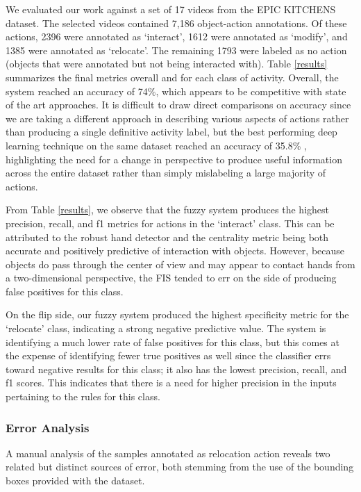 \documentclass[12pt]{report}
\begin{document}
We evaluated our work against a set of 17 videos from the EPIC KITCHENS dataset. The selected videos contained 7,186 object-action annotations. Of these actions, 2396 were annotated as `interact', 1612 were annotated as `modify', and 1385 were annotated as `relocate'. The remaining 1793 were labeled as no action (objects that were annotated but not being interacted with). Table \ref{results} summarizes the final metrics overall and for each class of activity. Overall, the system reached an accuracy of 74\%, which appears to be competitive with state of the art approaches. It is difficult to draw direct comparisons on accuracy since we are taking a different approach in describing various aspects of actions rather than producing a single definitive activity label, but the best performing deep learning technique on the same dataset reached an accuracy of 35.8\% \cite{Wang2021Self-supervisingDescriptors}, highlighting the need for a change in perspective to produce useful information across the entire dataset rather than simply mislabeling a large majority of actions.

From Table \ref{results}, we observe that the fuzzy system produces the highest precision, recall, and f1 metrics for actions in the `interact' class. This can be attributed to the robust hand detector and the centrality metric being both accurate and positively predictive of interaction with objects. However, because objects do pass through the center of view and may appear to contact hands from a two-dimensional perspective, the FIS tended to err on the side of producing false positives for this class.

On the flip side, our fuzzy system produced the highest specificity metric for the `relocate' class, indicating a strong negative predictive value. The system is identifying a much lower rate of false positives for this class, but this comes at the expense of identifying fewer true positives as well since the classifier errs toward negative results for this class; it also has the lowest precision, recall, and f1 scores. This indicates that there is a need for higher precision in the inputs pertaining to the rules for this class.

\subsubsection{Error Analysis}
A manual analysis of the samples annotated as relocation action reveals two related but distinct sources of error, both stemming from the use of the bounding boxes provided with the dataset.
\end{document}
